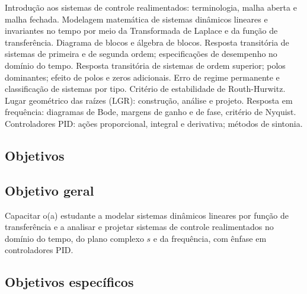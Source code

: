 \documentclass[oneside,a4paper,12pt]{article}
\begin{document}
Introdução aos sistemas de controle realimentados: terminologia, malha aberta e malha fechada. Modelagem matemática de sistemas dinâmicos lineares e invariantes no tempo por meio da Transformada de Laplace e da função de transferência. Diagrama de blocos e álgebra de blocos. Resposta transitória de sistemas de primeira e de segunda ordem; especificações de desempenho no domínio do tempo. Resposta transitória de sistemas de ordem superior; polos dominantes; efeito de polos e zeros adicionais. Erro de regime permanente e classificação de sistemas por tipo. Critério de estabilidade de Routh-Hurwitz. Lugar geométrico das raízes (LGR): construção, análise e projeto. Resposta em frequência: diagramas de Bode, margens de ganho e de fase, critério de Nyquist. Controladores PID: ações proporcional, integral e derivativa; métodos de sintonia.

  \begin{snugshade}
  \section{Objetivos}
\end{snugshade}

\subsection*{Objetivo geral}

Capacitar o(a) estudante a modelar sistemas dinâmicos lineares por função de transferência e a analisar e projetar sistemas de controle realimentados no domínio do tempo, do plano complexo $s$ e da frequência, com ênfase em controladores PID.

\subsection*{Objetivos específicos}
\end{document}
